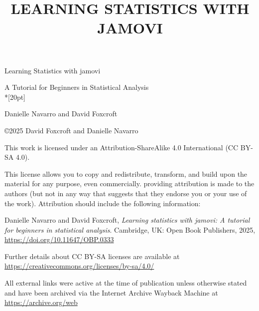 \documentclass[
  a4paper,
]{book}
\title{LEARNING STATISTICS WITH JAMOVI}
\author{}
\date{}
\let\oldmaketitle\maketitle
\begin{document}
\frontmatter
\maketitle
\begin{center}

\end{center}
\pagestyle{empty}
\let\maketitle\oldmaketitle
\maketitle
\mainmatter
\pagestyle{plain}

\hspace{0pt}
\vfill
\begin{center}

\Huge{Learning Statistics with jamovi}

\Large{A Tutorial for Beginners in Statistical Analysis}\\*[20pt]

\normalsize{Danielle Navarro and David Foxcroft}

\vfill
\end{center}
\hspace{0pt}
\pagebreak

\hspace{0pt}
\vfill

\copyright 2025 David Foxcroft and Danielle Navarro

This work is licensed under an Attribution-ShareAlike 4.0 International (CC BY-SA 4.0).

This license allows you to copy and redistribute, transform, and build upon the material for any purpose, even commercially. providing attribution is made to the authors (but not in any way that suggests that they endorse you or your use of the work). Attribution should include the following information:

Danielle Navarro and David Foxcroft, \textit{Learning statistics with jamovi: A tutorial for beginners in statistical analysis}. Cambridge, UK: Open Book Publishers, 2025, \url{https://doi.org/10.11647/OBP.0333}

Further details about CC BY-SA licenses are available at \\ \url{https://creativecommons.org/licenses/by-sa/4.0/}

All external links were active at the time of publication unless otherwise stated and have been archived via the Internet Archive Wayback Machine at \\ \url{https://archive.org/web}
\end{document}
